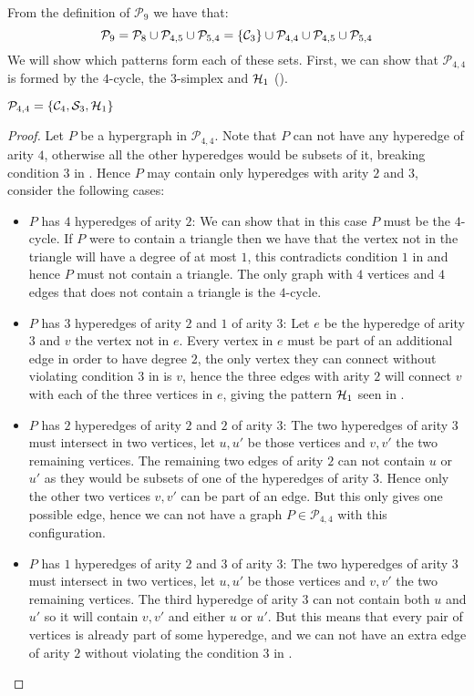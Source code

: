 \documentclass[a4paper,UKenglish,cleveref, autoref, numberwithinsect, thm-restate]{lipics-v2021}
\newcommand{\cycle}[1]{\cC_{#1}}
\newcommand{\simplex}[1]{\cS_{#1}}
\newcommand{\hyperone}{\cH_1}
\newcommand{\cC}{{\cal C}}
\newcommand{\cH}{{\cal H}}
\newcommand{\cP}{\mathcal{P}}
\newcommand{\cS}{\mathcal{S}}
\begin{document}
	From the definition of $\cP_9$ we have that:
	\[
		\cP_9 = \cP_8 \cup \cP_{4,5}  \cup \cP_{5,4} = \{\cycle{3}\} \cup \cP_{4,4} \cup \cP_{4,5}  \cup \cP_{5,4}
	\]
	We will show which patterns form each of these sets. First, we can show that $\cP_{4,4}$ is formed by the $4$-cycle, the $3$-simplex and $\hyperone$ ().
	
	\begin{claim}
		$\mathcal{P}_{4,4} = \{\cycle{4}, \simplex{3}, \hyperone \}$
	\end{claim}
	\begin{proof}
		Let $P$ be a hypergraph in $\mathcal{P}_{4,4}$. Note that $P$ can not have any hyperedge of arity $4$, otherwise all the other hyperedges would be subsets of it, breaking condition $3$ in . Hence $P$ may contain only hyperedges with arity $2$ and $3$, consider the following cases:
		\begin{itemize}
			\item $P$ has $4$ hyperedges of arity $2$: We can show that in this case $P$ must be the $4$-cycle. If $P$ were to contain a triangle then we have that the vertex not in the triangle will have a degree of at most $1$, this contradicts condition $1$ in  and hence $P$ must not contain a triangle. The only graph with $4$ vertices and $4$ edges that does not contain a triangle is the $4$-cycle.
			
			\item $P$ has $3$ hyperedges of arity $2$ and $1$ of arity $3$: Let $e$ be the hyperedge of arity $3$ and $v$ the vertex not in $e$. Every vertex in $e$ must be part of an additional edge in order to have degree $2$, the only vertex they can connect without violating condition $3$ in  is $v$, hence the three edges with arity $2$ will connect $v$ with each of the three vertices in $e$, giving the pattern $\hyperone$ seen in .
			
			\item $P$ has $2$ hyperedges of arity $2$ and $2$ of arity $3$: The two hyperedges of arity $3$ must intersect in two vertices, let $u,u'$ be those vertices and $v,v'$ the two remaining vertices. The remaining two edges of arity $2$ can not contain $u$ or $u'$ as they would be subsets of one of the hyperedges of arity $3$. Hence only the other two vertices $v,v'$ can be part of an edge. But this only gives one possible edge, hence we can not have a graph $P \in \mathcal{P}_{4,4}$ with this configuration.
			
			\item $P$ has $1$ hyperedges of arity $2$ and $3$ of arity $3$: The two hyperedges of arity $3$ must intersect in two vertices, let $u,u'$ be those vertices and $v,v'$ the two remaining vertices. The third hyperedge of arity $3$ can not contain both $u$ and $u'$ so it will contain $v,v'$ and either $u$ or $u'$. But this means that every pair of vertices is already part of some hyperedge, and we can not have an extra edge of arity $2$ without violating the condition $3$ in .
			

\end{itemize}
\end{proof}
\end{document}
